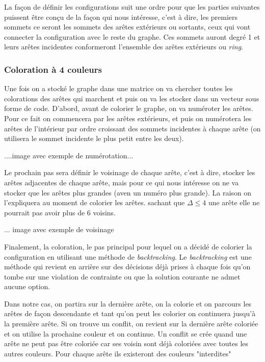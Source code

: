 \documentclass[10pt,a4paper]{article}
\begin{document}
La façon de définir les configurations suit une ordre pour que les parties suivantes puissent être conçu de la façon qui nous intéresse, c'est à dire, les premiers sommets ce seront les sommets des arêtes extérieurs ou sortants, ceux qui vont connecter la configuration avec le reste du graphe. Ces sommets auront degré 1 et leurs arêtes incidentes conformeront l'ensemble des arêtes extérieurs ou \emph{ring}.


\subsubsection{Coloration à 4 couleurs}

Une fois on a stocké le graphe dans une matrice on va chercher toutes les colorations des arêtes qui marchent et puis on va les stocker dans un vecteur sous forme de code. D'abord, avant de colorier le graphe, on va numéroter les arêtes. Pour ce fait on commencera par les arêtes extérieurs, et puis on numérotera les arêtes de l'intérieur par ordre croissant des sommets incidentes à chaque arête (on utilisera le sommet incidente le plus petit entre les deux).

....image avec exemple de numérotation...

Le prochain pas sera définir le voisinage de chaque arête, c'est à dire, stocker les arêtes adjacentes de chaque arête, mais pour ce qui nous intéresse on ne va stocker que les arêtes plus grandes (aven un numéro plus grande). La raison on l'expliquera au moment de colorier les arêtes. sachant que $\Delta \leq 4$ une arête elle ne pourrait pas avoir plus de 6 voisins.

... image avec exemple de voisinage

Finalement, la coloration, le pas principal pour lequel on a décidé de colorier la configuration en utilisant une méthode de \emph{backtracking}. Le \emph{backtracking} est une méthode qui revient en arrière sur des décisions déjà prises à chaque fois qu'on tombe sur une violation de contrainte ou que la solution courante ne admet aucune option. 

Dans notre cas, on partira sur la dernière arête, on la colorie et on parcours les arêtes de façon descendante et tant qu'on peut les colorier on continuera jusqu'à la première arête. Si on trouve un conflit, on revient sur la dernière arête coloriée et on utilise la prochaine couleur et on continue. Un conflit se crée quand une arête ne peut pas être coloriée car ses voisin sont déjà coloriées avec toutes les autres couleurs. Pour chaque arête ils existeront des couleurs "interdites" 
\end{document}
